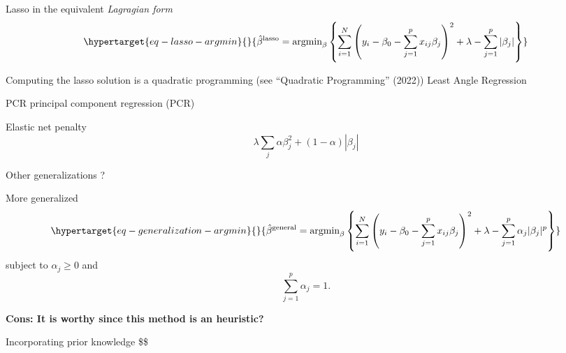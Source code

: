 \documentclass[
  ignorenonframetext,
  aspectratio=32,
]{beamer}
\begin{document}
\begin{frame}{Lasso in the equivalent \emph{Lagragian form}}
\protect\hypertarget{lasso-in-the-equivalent-lagragian-form}{}
\begin{equation}\protect\hypertarget{eq-lasso-argmin}{}{
\hat{\beta}^{\text{lasso}}
= 
\text{argmin}_\beta
\left\{
    \sum_{i = 1}^N
    \left(
        y_i - \beta_0 
        - \sum_{j = 1}^p
        x_{i j} \beta_j
    \right)^2
    + 
    \lambda
    - \sum_{j = 1}^p  |\beta_j|
\right\}
}\label{eq-lasso-argmin}\end{equation}

Computing the lasso solution is a quadratic programming (see
{``Quadratic Programming''} (2022)) Least Angle Regression
\end{frame}

\begin{frame}{PCR}
\protect\hypertarget{pcr}{}
principal component regression (PCR)
\end{frame}

\begin{frame}{Elastic net penalty}
\protect\hypertarget{elastic-net-penalty}{}
\[
\lambda \sum_j \alpha \beta_j^2 + (1 - \alpha) |\beta_j|
\]
\end{frame}

\begin{frame}{Other generalizations ?}
\protect\hypertarget{other-generalizations}{}
\end{frame}

\begin{frame}{More generalized}
\protect\hypertarget{more-generalized}{}
\begin{equation}\protect\hypertarget{eq-generalization-argmin}{}{
\hat{\beta}^{\text{general}}
= 
\text{argmin}_\beta
\left\{
    \sum_{i = 1}^N
    \left(
        y_i - \beta_0 
        - \sum_{j = 1}^p
        x_{i j} \beta_j
    \right)^2
    + 
    \lambda
    - \sum_{j = 1}^p  \alpha_j |\beta_j|^p
\right\}
}\label{eq-generalization-argmin}\end{equation} subject to
\(\alpha_j \geq 0\) and \[
\sum_{j = 1}^p  \alpha_j = 1. 
\]

\textbf{Cons: It is worthy since this method is an heuristic?}
\end{frame}

\begin{frame}{Incorporating prior knowledge}
\protect\hypertarget{incorporating-prior-knowledge}{}
\$\$
\end{frame}
\end{document}
